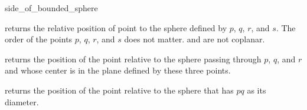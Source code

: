 \begin{ccRefFunction}{side_of_bounded_sphere}

         {returns the relative position of point 
          to the sphere defined by $p$, $q$, $r$, and $s$. The order
          of the points $p$, $q$, $r$, and $s$ does not matter.
          \ccPrecond {} and  are not coplanar.}

   {returns the position of the point  relative to the sphere
    passing through $p$, $q$, and $r$ and whose center is in the plane defined
    by these three points.}

 {returns the position of the point  relative to the sphere
  that has $pq$ as its diameter.}

\end{ccRefFunction}
